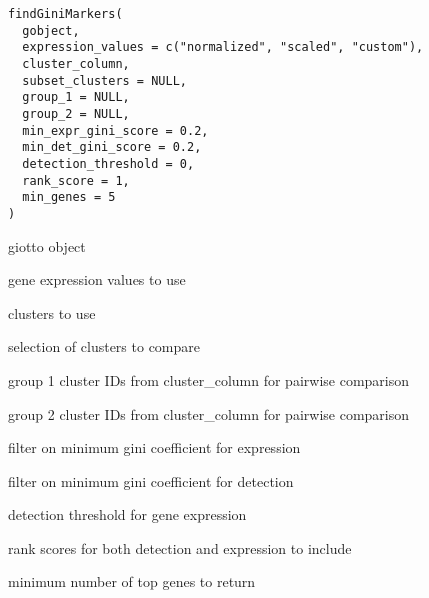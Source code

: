 \documentclass[a4paper]{book}
\begin{document}
%
\begin{Usage}
\begin{verbatim}
findGiniMarkers(
  gobject,
  expression_values = c("normalized", "scaled", "custom"),
  cluster_column,
  subset_clusters = NULL,
  group_1 = NULL,
  group_2 = NULL,
  min_expr_gini_score = 0.2,
  min_det_gini_score = 0.2,
  detection_threshold = 0,
  rank_score = 1,
  min_genes = 5
)
\end{verbatim}
\end{Usage}
%
\begin{Arguments}
\begin{ldescription}
\item[\code{gobject}] giotto object

\item[\code{expression\_values}] gene expression values to use

\item[\code{cluster\_column}] clusters to use

\item[\code{subset\_clusters}] selection of clusters to compare

\item[\code{group\_1}] group 1 cluster IDs from cluster\_column for pairwise comparison

\item[\code{group\_2}] group 2 cluster IDs from cluster\_column for pairwise comparison

\item[\code{min\_expr\_gini\_score}] filter on minimum gini coefficient for expression

\item[\code{min\_det\_gini\_score}] filter on minimum gini coefficient for detection

\item[\code{detection\_threshold}] detection threshold for gene expression

\item[\code{rank\_score}] rank scores for both detection and expression to include

\item[\code{min\_genes}] minimum number of top genes to return
\end{ldescription}
\end{Arguments}
%
\end{document}
